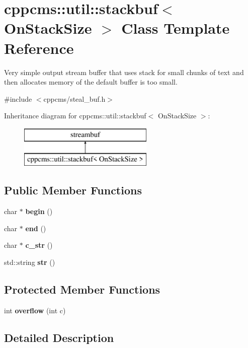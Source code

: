 \section{cppcms\+:\+:util\+:\+:stackbuf$<$ On\+Stack\+Size $>$ Class Template Reference}
\label{classcppcms_1_1util_1_1stackbuf}


Very simple output stream buffer that uses stack for small chunks of text and then allocates memory of the default buffer is too small.  




{\ttfamily \#include $<$cppcms/steal\+\_\+buf.\+h$>$}

Inheritance diagram for cppcms\+:\+:util\+:\+:stackbuf$<$ On\+Stack\+Size $>$\+:\begin{figure}[H]
\begin{center}
\leavevmode
\includegraphics[height=2.000000cm]{classcppcms_1_1util_1_1stackbuf}
\end{center}
\end{figure}
\subsection*{Public Member Functions}
\begin{DoxyCompactItemize}
\item 
char $\ast$ {\bf begin} ()
\item 
char $\ast$ {\bf end} ()
\item 
char $\ast$ {\bf c\+\_\+str} ()
\item 
std\+::string {\bf str} ()
\end{DoxyCompactItemize}
\subsection*{Protected Member Functions}
\begin{DoxyCompactItemize}
\item 
int {\bfseries overflow} (int c)\label{classcppcms_1_1util_1_1stackbuf_a52cd01fae4eae067e0363a21814afebb}

\end{DoxyCompactItemize}


\subsection{Detailed Description}
